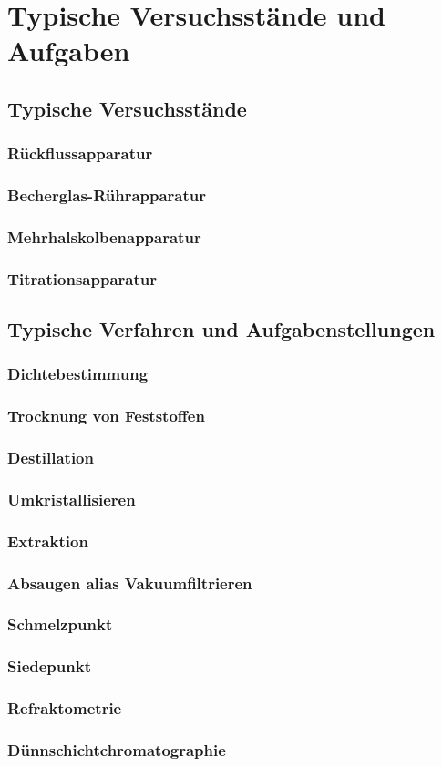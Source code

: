 \section{Typische Versuchsstände und Aufgaben}

\subsection{Typische Versuchsstände}
\subsubsection*{Rückflussapparatur}
\subsubsection*{Becherglas-Rührapparatur}
\subsubsection*{Mehrhalskolbenapparatur}
\subsubsection{Titrationsapparatur}

\subsection{Typische Verfahren und Aufgabenstellungen}
\subsubsection{Dichtebestimmung}
\subsubsection{Trocknung von Feststoffen}
\subsubsection{Destillation}
\subsubsection{Umkristallisieren}
\subsubsection{Extraktion}
\subsubsection{Absaugen alias Vakuumfiltrieren}
\subsubsection{Schmelzpunkt}
\subsubsection{Siedepunkt}
\subsubsection{Refraktometrie}
\subsubsection{Dünnschichtchromatographie}